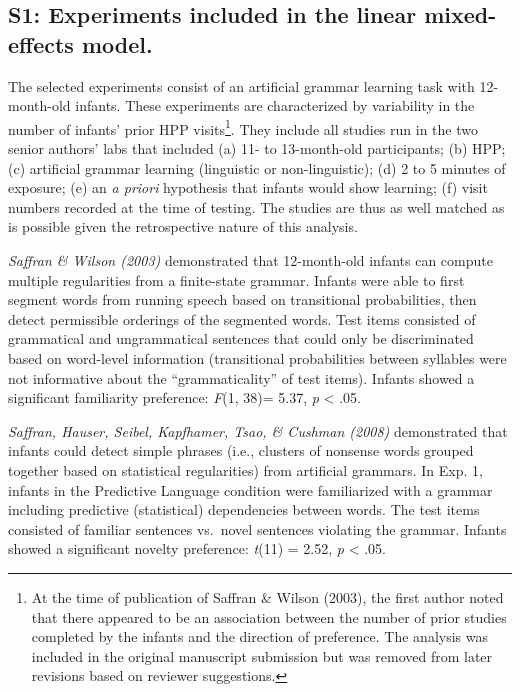 \documentclass[english,man,man,floatsintext]{apa6}
\begin{document}
\begin{appendix}
\section{}
\hypertarget{s1-experiments-included-in-the-linear-mixed-effects-model.}{%
\subsection{S1: Experiments included in the linear mixed-effects
model.}\label{s1-experiments-included-in-the-linear-mixed-effects-model.}}

The selected experiments consist of an artificial grammar learning task
with 12-month-old infants. These experiments are characterized by
variability in the number of infants' prior HPP visits\footnote{At the
time of publication of Saffran \& Wilson (2003), the first author
noted that there appeared to be an association between the number of
prior studies completed by the infants and the direction of
preference. The analysis was included in the original manuscript
submission but was removed from later revisions based on reviewer
suggestions.}. They include all studies run in the two senior authors'
labs that included (a) 11- to 13-month-old participants; (b) HPP; (c)
artificial grammar learning (linguistic or non-linguistic); (d) 2 to 5
minutes of exposure; (e) an \emph{a priori} hypothesis that infants
would show learning; (f) visit numbers recorded at the time of testing.
The studies are thus as well matched as is possible given the
retrospective nature of this analysis.

\emph{Saffran \& Wilson (2003)} demonstrated that 12-month-old infants
can compute multiple regularities from a finite-state grammar. Infants
were able to first segment words from running speech based on
transitional probabilities, then detect permissible orderings of the
segmented words. Test items consisted of grammatical and ungrammatical
sentences that could only be discriminated based on word-level
information (transitional probabilities between syllables were not
informative about the ``grammaticality'' of test items). Infants showed
a significant familiarity preference: \emph{F}(1, 38)= 5.37, \emph{p}
\textless{} .05.

\emph{Saffran, Hauser, Seibel, Kapfhamer, Tsao, \& Cushman (2008)}
demonstrated that infants could detect simple phrases (i.e., clusters of
nonsense words grouped together based on statistical regularities) from
artificial grammars. In Exp. 1, infants in the Predictive Language
condition were familiarized with a grammar including predictive
(statistical) dependencies between words. The test items consisted of
familiar sentences vs.~novel sentences violating the grammar. Infants
showed a significant novelty preference: \emph{t}(11) = 2.52, \emph{p}
\textless{} .05.


\end{appendix}
\end{document}
